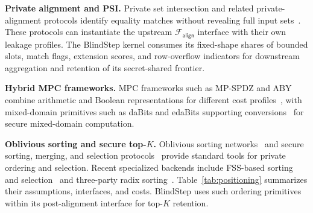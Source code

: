 \documentclass[conference,compsoc,letterpaper]{IEEEtran}
\theoremstyle{definition}
\theoremstyle{remark}
\newcommand{\BlindStep}{BlindStep\xspace}
\newcommand{\Falign}{\mathcal{F}_{\mathsf{align}}}
\begin{document}
\smallskip
\noindent\textbf{Private alignment and PSI.}
Private set intersection and related private-alignment protocols identify equality matches without revealing full input sets~\cite{rindal2021vole,kolesnikov2016efficient,mohassel2020fast}.
These protocols can instantiate the upstream $\Falign{}$ interface with their own leakage profiles.
The \BlindStep{} kernel consumes its fixed-shape shares of bounded slots, match flags, extension scores, and row-overflow indicators for downstream aggregation and retention of its secret-shared frontier.

\smallskip
\noindent\textbf{Hybrid MPC frameworks.}
MPC frameworks such as MP-SPDZ and ABY combine arithmetic and Boolean representations for different cost profiles~\cite{keller2020mp,demmler2015aby}, with mixed-domain primitives such as daBits and edaBits supporting conversions~\cite{escudero2020improved} for secure mixed-domain computation.

\smallskip
\noindent\textbf{Oblivious sorting and secure top-$K$.}
Oblivious sorting networks~\cite{batcher1968sorting} and secure sorting, merging, and selection protocols~\cite{hamada2012sorting,falk2021secure,asharov2020bucket} provide standard tools for private ordering and selection.
Recent specialized backends include FSS-based sorting and selection~\cite{agarwal2024secure} and three-party radix sorting~\cite{asharov2022efficient}.
Table~\ref{tab:positioning} summarizes their assumptions,
interfaces, and costs.
\BlindStep{} uses such ordering primitives within its post-alignment interface for top-$K$ retention.
\end{document}
